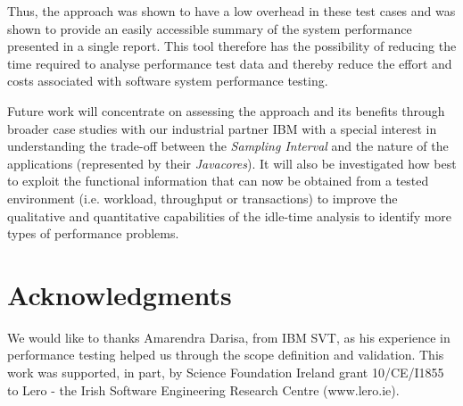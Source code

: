 \documentclass[runningheads,a4paper]{llncs}
\begin{document}
Thus, the approach was shown to have a low overhead in these test cases and was
shown to provide an easily accessible summary of the system performance
presented in a single report. This tool therefore has the possibility of
reducing the time required to analyse performance test data and thereby reduce
the effort and costs associated with software system performance testing.

Future work will concentrate on assessing the approach and its benefits through
broader case studies with our industrial partner IBM with a special interest in
understanding the trade-off between the \emph{Sampling Interval} and the nature
of the applications (represented by their \emph{Javacores}). It will also be
investigated how best to exploit the functional information that can now be
obtained from a tested environment (i.e. workload, throughput or transactions)
to improve the qualitative and quantitative capabilities of the idle-time
analysis to identify more types of performance problems.

\vspace{-5pt}
\section*{Acknowledgments}
\vspace{-5pt}
We would like to thanks Amarendra Darisa, from IBM SVT, as his experience in
performance testing helped us through the scope definition and validation. This
work was supported, in part, by Science Foundation Ireland grant 10/CE/I1855 to
Lero - the Irish Software Engineering Research Centre (www.lero.ie).




\end{document}
